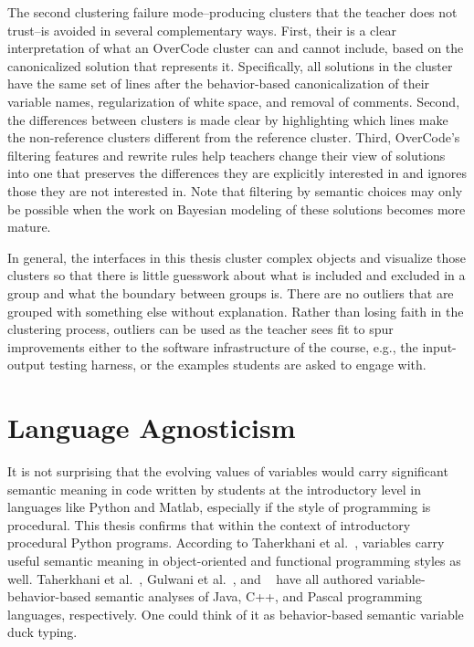 

The second clustering failure mode--producing clusters that the teacher does not trust--is avoided in several complementary ways. First, their is a clear interpretation of what an OverCode cluster can and cannot include, based on the canonicalized solution that represents it. Specifically, all solutions in the cluster have the same set of lines after the behavior-based canonicalization of their variable names, regularization of white space, and removal of comments. Second, the differences between clusters is made clear by highlighting which lines make the non-reference clusters different from the reference cluster. Third, OverCode's filtering features and rewrite rules help teachers change their view of solutions into one that preserves the differences they are explicitly interested in and ignores those they are not interested in. Note that filtering by semantic choices may only be possible when the work on Bayesian modeling of these solutions becomes more mature. 


In general, the interfaces in this thesis cluster complex objects and visualize those clusters so that there is little guesswork about what is included and excluded in a group and what the boundary between groups is. There are no outliers that are grouped with something else without explanation. Rather than losing faith in the clustering process, outliers can be used as the teacher sees fit to spur improvements either to the software infrastructure of the course, e.g., the input-output testing harness, or the examples students are asked to engage with. 

\section{Language Agnosticism}

It is not surprising that the evolving values of variables would carry significant semantic meaning in code written by students at the introductory level in languages like Python and Matlab, especially if the style of programming is procedural. This thesis confirms that within the context of introductory procedural Python programs. According to Taherkhani et al.~\cite{taherkhani2010recognizing}, variables carry useful semantic meaning in object-oriented and functional programming styles as well. Taherkhani et al.~\cite{}, Gulwani et al.~\cite{gulwani_fse14}, and ~\cite{sajaniemi2002empirical} have all authored variable-behavior-based semantic analyses of Java, C++, and Pascal programming languages, respectively. One could think of it as behavior-based semantic variable duck typing. 

